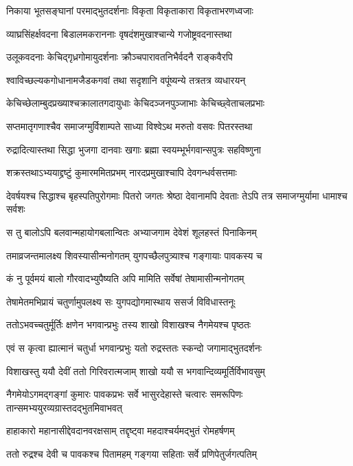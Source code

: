 \twolineshloka
{निकाया भूतसङ्घानां परमाद्भुतदर्शनाः}
{विकृता विकृताकारा विकृताभरणध्वजाः}


\twolineshloka
{व्याघ्रसिंहर्क्षवदना बिडालमकराननाः}
{वृषदंशमुखाश्चान्ये गजोष्ट्रवदनास्तथा}


\twolineshloka
{उलूकवदनाः केचिद्गृध्रगोमायुदर्शनाः}
{क्रौञ्चपारावतनिभैर्वदनै राङ्कवैरपि}


\twolineshloka
{श्वाविच्छल्यकगोधानामजैडकगवां तथा}
{सदृशानि वपूंष्यन्ये तत्रतत्र व्यधारयन्}


\twolineshloka
{केचिच्छेलाम्बुदप्रख्याश्चक्रालातगदायुधाः}
{केचिदञ्जनपुञ्जाभाः केचिच्छ्वेताचलप्रभाः}


\twolineshloka
{सप्तमातृगणाश्चैव समाजग्मुर्विशाम्पते}
{साध्या विश्वेऽथ मरुतो वसवः पितरस्तथा}


\twolineshloka
{रुद्रादित्यास्तथा सिद्धा भुजगा दानवाः खगाः}
{ब्रह्मा स्वयम्भूर्भगवान्सपुत्रः सहविष्णुना}


\twolineshloka
{शक्रस्तथाऽभ्ययाद्द्रष्टुं कुमारममितप्रभम्}
{नारदप्रमुखाश्चापि देवगन्धर्वसत्तमाः}


\threelineshloka
{देवर्षयश्च सिद्धाश्च बृहस्पतिपुरोगमाः}
{पितरो जगतः श्रेष्ठा देवानामपि देवताः}
{तेऽपि तत्र समाजग्मुर्यामा धामाश्च सर्वशः}


\twolineshloka
{स तु बालोऽपि बलवान्महायोगबलान्वितः}
{अभ्याजगाम देवेशं शूलहस्तं पिनाकिनम्}


\twolineshloka
{तमाव्रजन्तमालक्ष्य शिवस्यासीन्मनोगतम्}
{युगपच्छैलपुत्र्याश्च गङ्गायाः पावकस्य च}


\twolineshloka
{कं नु पूर्वमयं बालो गौरवादभ्युपैष्यति}
{अपि मामिति सर्वेषां तेषामासीन्मनोगतम्}


\twolineshloka
{तेषामेतमभिप्रायं चतुर्णामुपलक्ष्य सः}
{युगपद्योगमास्थाय ससर्ज विविधास्तनूः}


\twolineshloka
{ततोऽभवच्चतुर्मूर्तिः क्षणेन भगवान्प्रभुः}
{तस्य शाखो विशाखश्च नैगमेयश्च पृष्ठतः}


\twolineshloka
{एवं स कृत्वा ह्यात्मानं चतुर्धा भगवान्प्रभुः}
{यतो रुद्रस्ततः स्कन्दो जगामाद्भुतदर्शनः}


\twolineshloka
{विशाखस्तु ययौ देवीं ततो गिरिवरात्मजाम्}
{शाखो ययौ स भगवान्दिव्यमूर्तिर्विभावसुम्}


नैगमेयोऽगमद्गङ्गां कुमारः पावकप्रभः
\twolineshloka
{सर्वे भासुरदेहास्ते चत्वारः समरूपिणः}
{तान्समभ्ययुरव्यग्रास्तदद्भुतमिवाभवत्}


\twolineshloka
{हाहाकारो महानासीद्देवदानवरक्षसाम्}
{तद्दृष्ट्वा महदाश्चर्यमद्भुतं रोमहर्षणम्}


\twolineshloka
{ततो रुद्रश्च देवी च पावकश्च पितामहम्}
{गङ्गया सहिताः सर्वे प्रणिपेतुर्जगत्पतिम्}



